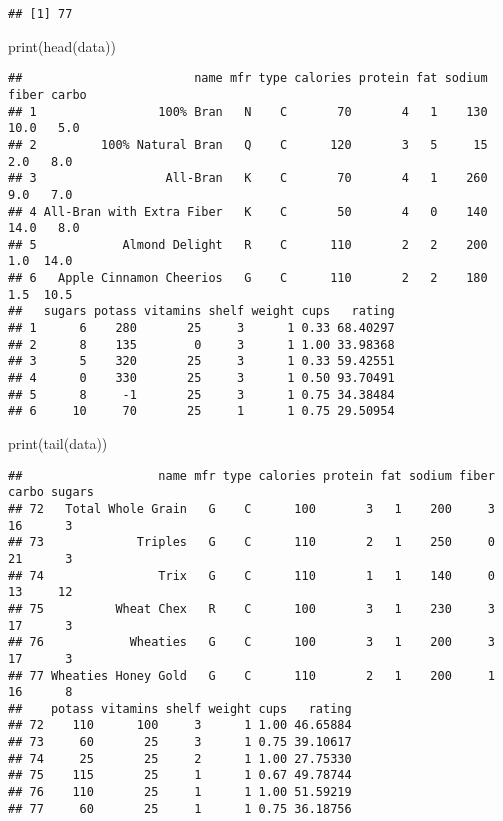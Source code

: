 \documentclass[
]{article}
\newenvironment{Shaded}{\begin{snugshade}}{\end{snugshade}}
\newcommand{\FunctionTok}[1]{\textcolor[rgb]{0.00,0.00,0.00}{#1}}
\newcommand{\NormalTok}[1]{#1}
\begin{document}
\begin{verbatim}
## [1] 77
\end{verbatim}

\begin{Shaded}
\begin{Highlighting}[]
\FunctionTok{print}\NormalTok{(}\FunctionTok{head}\NormalTok{(data))}
\end{Highlighting}
\end{Shaded}

\begin{verbatim}
##                        name mfr type calories protein fat sodium fiber carbo
## 1                 100% Bran   N    C       70       4   1    130  10.0   5.0
## 2         100% Natural Bran   Q    C      120       3   5     15   2.0   8.0
## 3                  All-Bran   K    C       70       4   1    260   9.0   7.0
## 4 All-Bran with Extra Fiber   K    C       50       4   0    140  14.0   8.0
## 5            Almond Delight   R    C      110       2   2    200   1.0  14.0
## 6   Apple Cinnamon Cheerios   G    C      110       2   2    180   1.5  10.5
##   sugars potass vitamins shelf weight cups   rating
## 1      6    280       25     3      1 0.33 68.40297
## 2      8    135        0     3      1 1.00 33.98368
## 3      5    320       25     3      1 0.33 59.42551
## 4      0    330       25     3      1 0.50 93.70491
## 5      8     -1       25     3      1 0.75 34.38484
## 6     10     70       25     1      1 0.75 29.50954
\end{verbatim}

\begin{Shaded}
\begin{Highlighting}[]
\FunctionTok{print}\NormalTok{(}\FunctionTok{tail}\NormalTok{(data))}
\end{Highlighting}
\end{Shaded}

\begin{verbatim}
##                   name mfr type calories protein fat sodium fiber carbo sugars
## 72   Total Whole Grain   G    C      100       3   1    200     3    16      3
## 73             Triples   G    C      110       2   1    250     0    21      3
## 74                Trix   G    C      110       1   1    140     0    13     12
## 75          Wheat Chex   R    C      100       3   1    230     3    17      3
## 76            Wheaties   G    C      100       3   1    200     3    17      3
## 77 Wheaties Honey Gold   G    C      110       2   1    200     1    16      8
##    potass vitamins shelf weight cups   rating
## 72    110      100     3      1 1.00 46.65884
## 73     60       25     3      1 0.75 39.10617
## 74     25       25     2      1 1.00 27.75330
## 75    115       25     1      1 0.67 49.78744
## 76    110       25     1      1 1.00 51.59219
## 77     60       25     1      1 0.75 36.18756
\end{verbatim}
\end{document}
